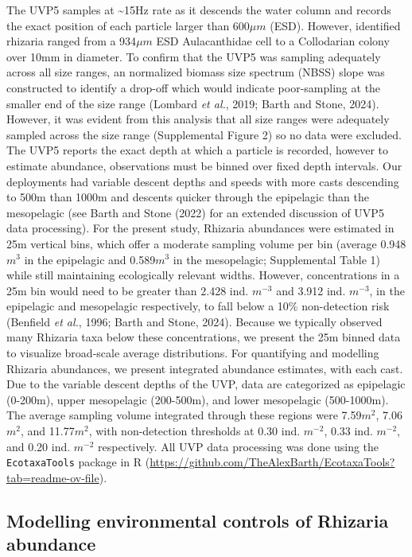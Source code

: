 \documentclass[
]{article}
\begin{document}
The UVP5 samples at \textasciitilde15Hz rate as it descends the water
column and records the exact position of each particle larger than
600\(\mu m\) (ESD). However, identified rhizaria ranged from a
934\(\mu m\) ESD Aulacanthidae cell to a Collodarian colony over 10mm in
diameter. To confirm that the UVP5 was sampling adequately across all
size ranges, an normalized biomass size spectrum (NBSS) slope was
constructed to identify a drop-off which would indicate poor-sampling at
the smaller end of the size range (Lombard \emph{et al.}, 2019; Barth
and Stone, 2024). However, it was evident from this analysis that all
size ranges were adequately sampled across the size range (Supplemental
Figure 2) so no data were excluded. The UVP5 reports the exact depth at
which a particle is recorded, however to estimate abundance,
observations must be binned over fixed depth intervals. Our deployments
had variable descent depths and speeds with more casts descending to
500m than 1000m and descents quicker through the epipelagic than the
mesopelagic (see Barth and Stone (2022) for an extended discussion of
UVP5 data processing). For the present study, Rhizaria abundances were
estimated in 25m vertical bins, which offer a moderate sampling volume
per bin (average 0.948\(m^3\) in the epipelagic and 0.589\(m^3\) in the
mesopelagic; Supplemental Table 1) while still maintaining ecologically
relevant widths. However, concentrations in a 25m bin would need to be
greater than 2.428 ind. \(m^{-3}\) and 3.912 ind. \(m^{-3}\), in the
epipelagic and mesopelagic respectively, to fall below a 10\%
non-detection risk (Benfield \emph{et al.}, 1996; Barth and Stone,
2024). Because we typically observed many Rhizaria taxa below these
concentrations, we present the 25m binned data to visualize broad-scale
average distributions. For quantifying and modelling Rhizaria
abundances, we present integrated abundance estimates, with each cast.
Due to the variable descent depths of the UVP, data are categorized as
epipelagic (0-200m), upper mesopelagic (200-500m), and lower mesopelagic
(500-1000m). The average sampling volume integrated through these
regions were 7.59\(m^2\), 7.06\(m^2\), and 11.77\(m^2\), with
non-detection thresholds at 0.30 ind. \(m^{-2}\), 0.33 ind. \(m^{-2}\),
and 0.20 ind. \(m^{-2}\) respectively. All UVP data processing was done
using the \texttt{EcotaxaTools} package in R
(\url{https://github.com/TheAlexBarth/EcotaxaTools?tab=readme-ov-file}).

\hypertarget{modelling-environmental-controls-of-rhizaria-abundance}{%
\subsection{Modelling environmental controls of Rhizaria
abundance}\label{modelling-environmental-controls-of-rhizaria-abundance}}
\end{document}
